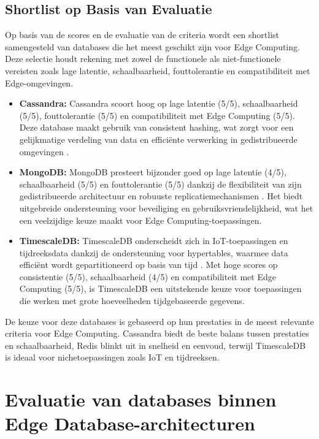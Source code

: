 \subsection{Shortlist op Basis van Evaluatie}
Op basis van de scores en de evaluatie van de criteria wordt een shortlist samengesteld van databases die het meest geschikt zijn voor Edge Computing. Deze selectie houdt rekening met zowel de functionele als niet-functionele vereisten zoals lage latentie, schaalbaarheid, fouttolerantie en compatibiliteit met Edge-omgevingen.

\begin{itemize}
    \item \textbf{Cassandra:} Cassandra scoort hoog op lage latentie (5/5), schaalbaarheid (5/5), fouttolerantie (5/5) en compatibiliteit met Edge Computing (5/5). Deze database maakt gebruik van consistent hashing, wat zorgt voor een gelijkmatige verdeling van data en efficiënte verwerking in gedistribueerde omgevingen \autocite{CassandraDocumentation}.
    \item \textbf{MongoDB:} MongoDB presteert bijzonder goed op lage latentie (4/5), schaalbaarheid (5/5) en fouttolerantie (5/5) dankzij de flexibiliteit van zijn gedistribueerde architectuur en robuuste replicatiemechanismen \autocite{MongoDBDocumentation}. Het biedt uitgebreide ondersteuning voor beveiliging en gebruiksvriendelijkheid, wat het een veelzijdige keuze maakt voor Edge Computing-toepassingen.
    \item \textbf{TimescaleDB:} TimescaleDB onderscheidt zich in IoT-toepassingen en tijdreeksdata dankzij de ondersteuning voor hypertables, waarmee data efficiënt wordt gepartitioneerd op basis van tijd \autocite{TimescaleDBDocumentation}. Met hoge scores op consistentie (5/5), schaalbaarheid (4/5) en compatibiliteit met Edge Computing (5/5), is TimescaleDB een uitstekende keuze voor toepassingen die werken met grote hoeveelheden tijdgebaseerde gegevens.
\end{itemize}

De keuze voor deze databases is gebaseerd op hun prestaties in de meest relevante criteria voor Edge Computing. Cassandra biedt de beste balans tussen prestaties en schaalbaarheid, Redis blinkt uit in snelheid en eenvoud, terwijl TimescaleDB is ideaal voor nichetoepassingen zoals IoT en tijdreeksen.

\section{Evaluatie van databases binnen Edge Database-architecturen}

